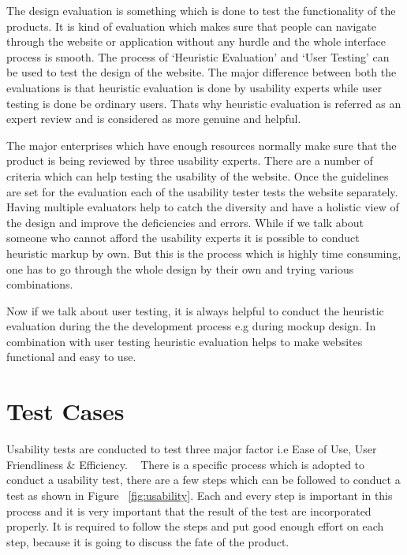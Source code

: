 The design evaluation is something which is done to test the functionality of the products. It is kind of evaluation which makes sure that people can navigate through the website or application without any hurdle and the whole interface process is smooth. The process of `Heuristic Evaluation' and `User Testing' can be used to test the design of the website. The major difference between both the evaluations is that heuristic evaluation is done by usability experts while user testing is done be ordinary users. Thats why heuristic evaluation is referred as an expert review and is considered as more genuine and helpful. \par
The major enterprises which have enough resources normally make sure that the product is being reviewed by three usability experts. There are a number of criteria which can help testing the usability of the website. Once the guidelines are set for the evaluation each of the usability tester tests the website separately. Having multiple evaluators help to catch the diversity and have a holistic view of the design and improve the deficiencies and errors. While if we talk about someone who cannot afford the usability experts it is possible to conduct heuristic markup by own. But this is the process which is highly time consuming, one has to go through the whole design by their own and trying various combinations.\par
Now if we talk about user testing, it is always helpful to conduct the heuristic evaluation during the the development process e.g during mockup design. In combination with user testing heuristic  evaluation helps to make websites functional and easy to use. ~\cite{test}
\section{Test Cases} 
Usability tests are conducted to test three major factor i.e Ease of Use, User Friendliness \& Efficiency.  ~\cite{sixsteps}
There is a specific process which is adopted to conduct a usability test, there are a few steps which can be followed to conduct a test as shown in Figure ~\ref{fig:usability}.
Each and every step is important in this process and it is very important that the result of the test are incorporated properly. It is required to follow the steps and put good enough effort on each step, because it is going to discuss the fate of the product. 

